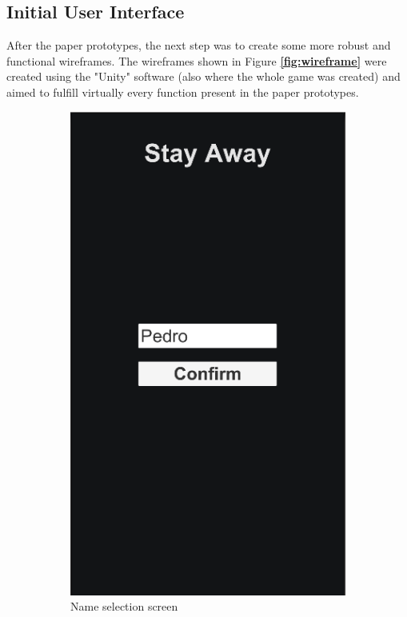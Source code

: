 \documentclass{dissertation}
\begin{document}
\subsection{Initial User Interface}

After the paper prototypes, the next step was to create some more robust and functional wireframes. The wireframes shown in Figure \textbf{\ref{fig:wireframe}} were created using the "Unity" software (also where the whole game was created) and aimed to fulfill virtually every function present in the paper prototypes. 

\begin{figure}[H]
\begin{subfigure}[h]{.5\textwidth}
\centering
\includegraphics[width = .7\linewidth]{images/wireframe1.png}
\caption{Name selection screen}
\label{fig:pp1}
\end{subfigure}
\begin{subfigure}[h]{.5\textwidth}
\centering

\end{subfigure}
\end{figure}
\end{document}
